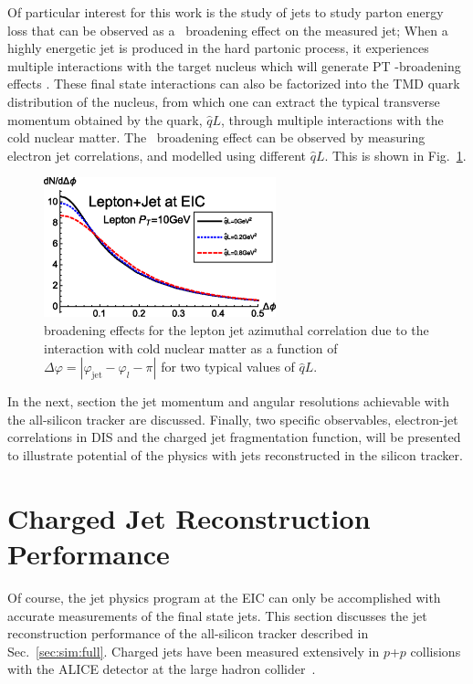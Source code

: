 Of particular interest for this work is the study of jets to study parton energy loss that can be observed as a \pt~broadening effect on the measured jet; When a highly energetic jet is produced in the hard partonic process, it experiences multiple interactions with the target nucleus which will generate PT -broadening effects \cite{Baier1997}. These final state interactions can also be factorized into the TMD quark distribution of the nucleus, from which one can extract the typical transverse momentum obtained by the quark, $\hat{q}L$, through multiple interactions with the cold nuclear matter\cite{Liang2008a}.  The \pt~broadening effect can be observed by measuring electron jet correlations, and modelled using different $\hat{q}L$. This is shown in Fig.~\ref{fig:ql_corr}.

\begin{figure}[htpb]
  \centering
  \includegraphics[width=0.6\textwidth]{EIC_Jets/qL_corr.png}
  \caption{\pt broadening effects  for the lepton jet azimuthal correlation due to the interaction with cold nuclear matter as a function of $\Delta\varphi = |\varphi_\mathrm{jet} - \varphi_{l} - \pi|$ for two typical values of $\hat{q}L$\cite{Liu2019}.}
  \label{fig:ql_corr}
\end{figure}

In the next, section the jet momentum and angular resolutions achievable with the all-silicon tracker are discussed.
Finally, two specific observables, electron-jet correlations in DIS and the charged jet fragmentation function, will be presented to illustrate potential of the physics with jets reconstructed in the silicon tracker. 


\section{Charged Jet Reconstruction Performance}

Of course, the jet physics program at the EIC can only be accomplished with accurate measurements of the final state jets. This section discusses the jet reconstruction performance of the all-silicon tracker described in Sec.~\ref{sec:sim:full}. Charged jets have been measured extensively in $p$+$p$ collisions with the ALICE detector at the large hadron collider~\cite{PhysRevD.91.112012}.

